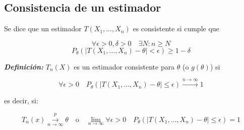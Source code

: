 \subsection{Consistencia de un estimador}

Se dice que un estimador $T(X_1,\dots,X_n)$ es consistente si cumple que

\[
    \forall \epsilon > 0, \delta > 0 \quad \exists N: n \geq N
\]
\[
    P_\theta(|T(X_1, \dots, X_n) - \theta| < \epsilon) \geq 1 - \delta
\]

\textbf{\textit{Definición: }} $T_n(X)$ es un estimador consistente para $\theta$ (o $g(\theta)$) si

\[
    \forall \epsilon > 0 \quad P_\theta\left(|T(X_1, \dots, X_n) - \theta| \leq \epsilon\right) \xrightarrow{n \to \infty} 1
\]

es decir, si:

\[
    T_n(x) \overset{p}{\underset{n \to \infty}{\to}} \theta \quad \text{o} \quad \lim_{n \to \infty} \forall \epsilon > 0 \quad P_\theta(|T(X_1, \dots, X_n) - \theta| \leq \epsilon) = 1
\]


